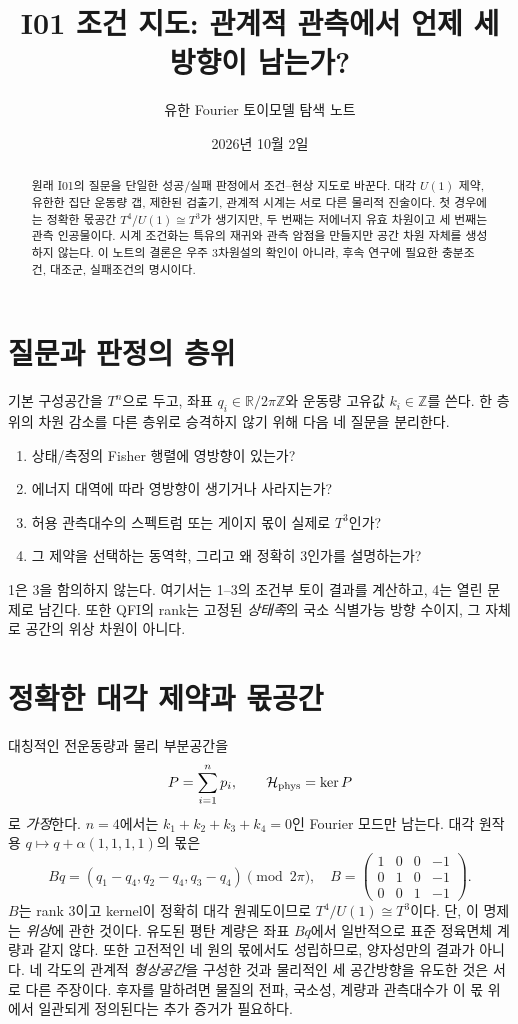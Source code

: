 \documentclass[11pt,a4paper]{article}
\title{I01 조건 지도: 관계적 관측에서 언제 세 방향이 남는가?}
\author{유한 Fourier 토이모델 탐색 노트}
\date{2026년 10월 2일}
\begin{document}
\maketitle

\begin{abstract}
원래 I01의 질문을 단일한 성공/실패 판정에서 조건--현상 지도로 바꾼다.
대각 $U(1)$ 제약, 유한한 집단 운동량 갭, 제한된 검출기, 관계적 시계는
서로 다른 물리적 진술이다. 첫 경우에는 정확한 몫공간 $T^4/U(1)\cong T^3$가
생기지만, 두 번째는 저에너지 유효 차원이고 세 번째는 관측 인공물이다.
시계 조건화는 특유의 재귀와 관측 암점을 만들지만 공간 차원 자체를
생성하지 않는다. 이 노트의 결론은 우주 3차원설의 확인이 아니라,
후속 연구에 필요한 충분조건, 대조군, 실패조건의 명시이다.
\end{abstract}

\section{질문과 판정의 층위}
기본 구성공간을 $T^n$으로 두고, 좌표 $q_i\in\mathbb R/2\pi\mathbb Z$와
운동량 고유값 $k_i\in\mathbb Z$를 쓴다. 한 층위의 차원 감소를 다른
층위로 승격하지 않기 위해 다음 네 질문을 분리한다.
\begin{enumerate}
\item 상태/측정의 Fisher 행렬에 영방향이 있는가?
\item 에너지 대역에 따라 영방향이 생기거나 사라지는가?
\item 허용 관측대수의 스펙트럼 또는 게이지 몫이 실제로 $T^3$인가?
\item 그 제약을 선택하는 동역학, 그리고 왜 정확히 3인가를 설명하는가?
\end{enumerate}
1은 3을 함의하지 않는다. 여기서는 1--3의 조건부 토이 결과를 계산하고,
4는 열린 문제로 남긴다. 또한 QFI의 rank는 고정된 \emph{상태족}의 국소
식별가능 방향 수이지, 그 자체로 공간의 위상 차원이 아니다.

\section{정확한 대각 제약과 몫공간}
대칭적인 전운동량과 물리 부분공간을
\begin{equation}
P=\sum_{i=1}^{n}p_i,\qquad
\mathcal H_{\rm phys}=\ker P
\end{equation}
로 \emph{가정}한다. $n=4$에서는 $k_1+k_2+k_3+k_4=0$인 Fourier 모드만
남는다. 대각 원작용 $q\mapsto q+\alpha(1,1,1,1)$의 몫은
\begin{equation}
Bq=(q_1-q_4,q_2-q_4,q_3-q_4)\pmod{2\pi},\quad
B=\begin{pmatrix}1&0&0&-1\\0&1&0&-1\\0&0&1&-1\end{pmatrix}.
\end{equation}
$B$는 rank 3이고 kernel이 정확히 대각 원궤도이므로
$T^4/U(1)\cong T^3$이다. 단, 이 명제는 \emph{위상}에 관한 것이다.
유도된 평탄 계량은 좌표 $Bq$에서 일반적으로 표준 정육면체 계량과
같지 않다. 또한 고전적인 네 원의 몫에서도 성립하므로, 양자성만의
결과가 아니다. 네 각도의 관계적 \emph{형상공간}을 구성한 것과
물리적인 세 공간방향을 유도한 것은 서로 다른 주장이다. 후자를
말하려면 물질의 전파, 국소성, 계량과 관측대수가 이 몫 위에서
일관되게 정의된다는 추가 증거가 필요하다.
\end{document}
